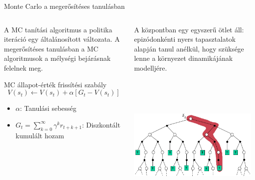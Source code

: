 \documentclass[english, aspectratio=169]{beamer}
\begin{document}
\begin{frame}{Monte Carlo a megerősítéses tanulásban}
\begin{columns}
\begin{column}{.5\textwidth}
A MC tanítási algoritmus a politika iteráció egy általánosított változata. A megerősítéses tanulásban a MC algoritmusok a mélységi bejárásnak felelnek meg. \par\smallskip
\begin{block}{MC állapot-érték frissítési szabály}
\[
V(s_{t}) \leftarrow V(s_{t}) + \alpha \left[ G_{t} - V(s_{t}) \right]
\]
\vspace{-0.5cm}
\begin{itemize}
	\item $\alpha$: Tanulási sebesség
	\item $G_{t} = \sum_{k=0}^\infty \gamma^k r_{t+k+1}$: Diszkontált kumulált hozam
\end{itemize}
\end{block}
\end{column}
\begin{column}{.5\textwidth}
A központban egy egyszerű ötlet áll: epizódonkénti nyers tapasztalatok alapján tanul anélkül, hogy szüksége lenne a környezet dinamikájának modelljére.
\begin{center}
\includegraphics[width=7cm, height=7cm, keepaspectratio]{images/mc_td_3.png}
\end{center}
\end{column}
\end{columns}
\end{frame}
\end{document}
